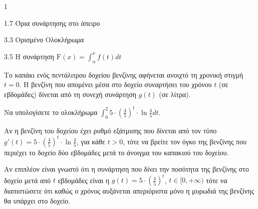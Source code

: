 \begin{ylh}{1}
    \item 1.7 Όρια συνάρτησης στο άπειρο
    \item 3.3 Ορισμένο Ολοκλήρωμα
    \item 3.5 Η συνάρτηση $\mathrm{F}(x) = \int_\alpha^x f(t) dt$
\end{ylh}

Το καπάκι ενός πεντάλιτρου δοχείου βενζίνης αφήνεται ανοιχτό τη χρονική στιγμή $t = 0$. Η βενζίνη που απομένει μέσα στο δοχείο συναρτήσει του χρόνου $t$ (σε εβδομάδες) δίνεται από τη συνεχή συνάρτηση $g(t)$ (σε λίτρα).

\begin{alist}
\item Να υπολογίσετε το ολοκλήρωμα $\int_0^2 5 \cdot \left(\frac{4}{5}\right)^t \cdot \ln \frac{4}{5} dt$. 
\item Αν η βενζίνη του δοχείου έχει ρυθμό εξάτμισης που δίνεται από τον τύπο $g'(t)=5 \cdot \left(\frac{4}{5}\right)^t \cdot \ln \frac{4}{5}$, για κάθε $t > 0$, τότε να βρείτε τον όγκο της βενζίνης που περιέχει το δοχείο δύο εβδομάδες μετά το άνοιγμα του καπακιού του δοχείου. 
\item Αν επιπλέον είναι γνωστό ότι η συνάρτηση που δίνει την ποσότητα της βενζίνης στο δοχείο μετά από $t$ εβδομάδες είναι η $g(t)=5 \cdot \left(\frac{4}{5}\right)^t$, $t \in [0, +\infty)$ τότε να διαπιστώσετε ότι καθώς ο χρόνος αυξάνεται απεριόριστα μόνο η μυρωδιά της βενζίνης θα υπάρχει στο δοχείο. 
\end{alist}